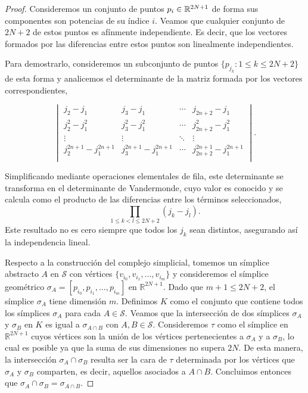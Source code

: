 \begin{proof}
	Consideremos un conjunto de puntos $p_{i}\in \mathbb{R}^{2N+1}$ de forma sus componentes
	son potencias de su índice $i$. Veamos que cualquier conjunto de $2N+2$ de
	estos puntos es afínmente independiente. Es decir, que los vectores formados
	por las diferencias entre estos puntos son linealmente independientes.
	
	Para demostrarlo, consideremos un subconjunto de puntos $\{p_{j_k}: 1 \leq k \leq
	2N+2\}$ de esta forma y analicemos el determinante de la matriz formada por los
	vectores correspondientes,
	
	\[
	\begin{vmatrix}
		j_{2}- j_{1}               & j_{3}- j_{1}               & \cdots & j_{2n+2}- j_{1}               \\
		j_{2}^{2}- j_{1}^{2}       & j_{3}^{2}- j_{1}^{2}       & \cdots & j_{2n+2}^{2}- j_{1}^{2}       \\
		\vdots                     & \vdots                     & \ddots & \vdots                        \\
		j_{2}^{2n+1}- j_{1}^{2n+1} & j_{3}^{2n+1}- j_{1}^{2n+1} & \cdots & j_{2n+2}^{2n+1}- j_{1}^{2n+1} \\
	\end{vmatrix}
	.
	\]
	
	Simplificando mediante operaciones elementales de fila, este determinante se transforma
	en el determinante de Vandermonde, cuyo valor es conocido y se calcula como el
	producto de las diferencias entre los términos seleccionados,
	\[
	\prod_{1 \leq k < l \leq 2N+2}(j_{k}- j_{l}).
	\]
	Este resultado no es cero siempre que todos los $j_{k}$ sean distintos,
	asegurando así la independencia lineal.
	
	Respecto a la construcción del complejo simplicial, tomemos un símplice abstracto
	$A$ en $\mathcal{S}$ con vértices $\{v_{i_0}, v_{i_1}, \ldots, v_{i_m}\}$ y consideremos
	el símplice geométrico $\sigma_{A}= [p_{i_0}, p_{i_1}, \ldots, p_{i_m}]$ en $\mathbb{R}
	^{2N+1}$. Dado que $m+1 \leq 2N + 2$, el símplice $\sigma_{A}$ tiene dimensión
	$m$. Definimos $K$ como el conjunto que contiene todos los símplices
	$\sigma_{A}$ para cada $A \in \mathcal{S}$. Veamos que la intersección de dos símplices
	$\sigma_{A}$ y $\sigma_{B}$ en $K$ es igual a $\sigma_{A \cap B}$ con $A,B \in
	\mathcal{S}$. Consideremos $\tau$ como el símplice en $\mathbb{R}^{2N+1}$
	cuyos vértices son la unión de los vértices pertenecientes a $\sigma_{A}$ y a
	$\sigma_{B}$, lo cual es posible ya que la suma de sus dimensiones no supera $2
	N$. De esta manera, la intersección $\sigma_{A}\cap \sigma_{B}$ resulta ser la
	cara de $\tau$ determinada por los vértices que $\sigma_{A}$ y $\sigma_{B}$ comparten,
	es decir, aquellos asociados a $A \cap B$. Concluimos entonces que
	$\sigma_{A}\cap \sigma_{B}= \sigma_{A \cap B}$.
\end{proof}

